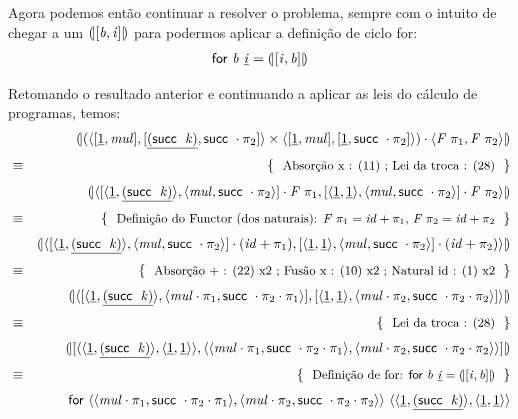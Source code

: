 \documentclass[a4paper]{article}
\newcommand{\Conid}[1]{\mathit{#1}}
\newcommand{\Varid}[1]{\mathit{#1}}
\begin{document}
\begin{enumerate}
Agora podemos então continuar a resolver o problema, sempre com o intuito de chegar
a um \ensuremath{\cata{\alt{\Varid{b}}{\Varid{i}}}} para podermos aplicar a definição de ciclo for:
\begin{eqnarray*}
\ensuremath{\mathsf{for}\ \Varid{b}\ \underline{\Varid{i}}\mathrel{=}\cata{\alt{\Varid{i}}{\Varid{b}}}}
\end{eqnarray*}

\vspace{0.5cm}

Retomando o resultado anterior e continuando a aplicar as leis do cálculo de programas, temos:
\begin{eqnarray*}
\start
\ensuremath{\cata{(\conj{\alt{\underline{\mathrm{1}}}{\Varid{mul}}}{\alt{\underline{(\succ \;\Varid{k})}}{\succ \comp \p2}}\times\conj{\alt{\underline{\mathrm{1}}}{\Varid{mul}}}{\alt{\underline{\mathrm{1}}}{\succ \comp \p2}})\comp \conj{\Conid{F}\;\p1}{\Conid{F}\;\p2}}}
%
\just\equiv{ Absorção x : (11) ; Lei da troca : (28) }
%
\ensuremath{\cata{\conj{\alt{\conj{\underline{\mathrm{1}}}{\underline{(\succ \;\Varid{k})}}}{\conj{\Varid{mul}}{\succ \comp \p2}}\comp \Conid{F}\;\p1}{\alt{\conj{\underline{\mathrm{1}}}{\underline{\mathrm{1}}}}{\conj{\Varid{mul}}{\succ \comp \p2}}\comp \Conid{F}\;\p2}}}
%
\just\equiv{ Definição do Functor (dos naturais): \ensuremath{\Conid{F}\;\p1\mathrel{=}\Varid{id}\mathbin{+}\p1}, \ensuremath{\Conid{F}\;\p2\mathrel{=}\Varid{id}\mathbin{+}\p2} }
%
\ensuremath{\cata{\conj{\alt{\conj{\underline{\mathrm{1}}}{\underline{(\succ \;\Varid{k})}}}{\conj{\Varid{mul}}{\succ \comp \p2}}\comp (\Varid{id}\mathbin{+}\p1)}{\alt{\conj{\underline{\mathrm{1}}}{\underline{\mathrm{1}}}}{\conj{\Varid{mul}}{\succ \comp \p2}}\comp (\Varid{id}\mathbin{+}\p2)}}}
%
\just\equiv{ Absorção + : (22) x2 ; Fusão x : (10) x2 ; Natural id : (1) x2 }
%
\ensuremath{\cata{\conj{\alt{\conj{\underline{\mathrm{1}}}{\underline{(\succ \;\Varid{k})}}}{\conj{\Varid{mul}\comp \p1}{\succ \comp \p2\comp \p1}}}{\alt{\conj{\underline{\mathrm{1}}}{\underline{\mathrm{1}}}}{\conj{\Varid{mul}\comp \p2}{\succ \comp \p2\comp \p2}}}}}
%
\just\equiv{ Lei da troca : (28) }
%
\ensuremath{\cata{\alt{\conj{\conj{\underline{\mathrm{1}}}{\underline{(\succ \;\Varid{k})}}}{\conj{\underline{\mathrm{1}}}{\underline{\mathrm{1}}}}}{\conj{\conj{\Varid{mul}\comp \p1}{\succ \comp \p2\comp \p1}}{\conj{\Varid{mul}\comp \p2}{\succ \comp \p2\comp \p2}}}}}
%
\just\equiv{ Definição de for: \ensuremath{\mathsf{for}\ \Varid{b}\ \underline{\Varid{i}}\mathrel{=}\cata{\alt{\Varid{i}}{\Varid{b}}}} }
%
\ensuremath{\mathsf{for}\ \conj{\conj{\Varid{mul}\comp \p1}{\succ \comp \p2\comp \p1}}{\conj{\Varid{mul}\comp \p2}{\succ \comp \p2\comp \p2}}\ \conj{\conj{\underline{\mathrm{1}}}{\underline{(\succ \;\Varid{k})}}}{\conj{\underline{\mathrm{1}}}{\underline{\mathrm{1}}}}}
\end{eqnarray*}



\end{enumerate}
\end{document}
